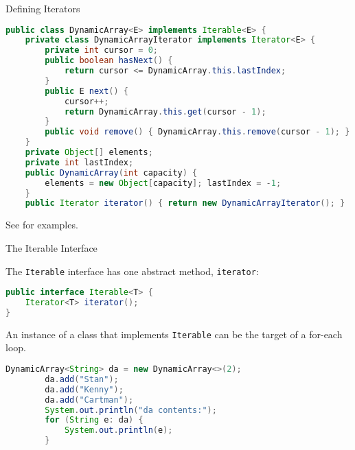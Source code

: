\documentclass{beamer}
\begin{document}
\begin{frame}[fragile]{Defining Iterators}

\vspace{-.1in}
\begin{lstlisting}[language=Java]
public class DynamicArray<E> implements Iterable<E> {
    private class DynamicArrayIterator implements Iterator<E> {
        private int cursor = 0;
        public boolean hasNext() {
            return cursor <= DynamicArray.this.lastIndex;
        }
        public E next() {
            cursor++;
            return DynamicArray.this.get(cursor - 1);
        }
        public void remove() { DynamicArray.this.remove(cursor - 1); }
    }
    private Object[] elements;
    private int lastIndex;
    public DynamicArray(int capacity) {
        elements = new Object[capacity]; lastIndex = -1;
    }
    public Iterator iterator() { return new DynamicArrayIterator(); }
\end{lstlisting}
\vspace{-.1in}
See  for examples.

\end{frame}

\begin{frame}[fragile]{The Iterable Interface}

The {\tt Iterable} interface has one abstract method, {\tt iterator}:

\begin{lstlisting}[language=Java]
public interface Iterable<T> {
    Iterator<T> iterator();
}
\end{lstlisting}

An instance of a class that implements {\tt Iterable} can be the target of a for-each loop.
\begin{lstlisting}[language=Java]
        DynamicArray<String> da = new DynamicArray<>(2);
        da.add("Stan");
        da.add("Kenny");
        da.add("Cartman");
        System.out.println("da contents:");
        for (String e: da) {
            System.out.println(e);
        }

\end{lstlisting}

\end{frame}
\end{document}
